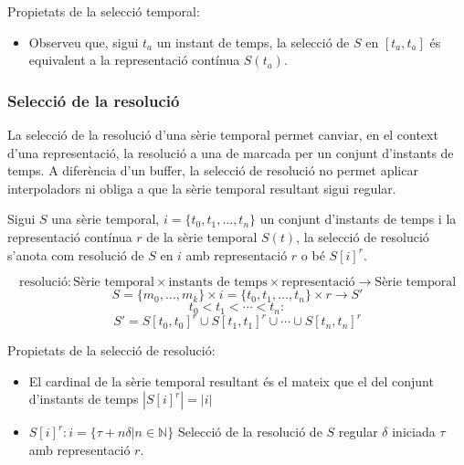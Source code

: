 Propietats de la selecció temporal:

\begin{itemize}
\item Observeu que, sigui $t_a$ un instant de temps, la selecció de $S$ en $[t_a,t_a]$ és equivalent a la representació contínua $S(t_a)$. 
\end{itemize}







\subsubsection{Selecció de la resolució}

La selecció de la resolució d'una sèrie temporal permet canviar, en el
context d'una representació, la resolució a una de marcada per un
conjunt d'instants de temps. A diferència d'un buffer, la selecció de
resolució no permet aplicar interpoladors ni obliga a que la sèrie
temporal resultant sigui regular.

Sigui $S$ una sèrie temporal, $i= \{t_0,t_1,\dotsc,t_n\}$ un conjunt
d'instants de temps i la representació contínua $r$ de la sèrie
temporal $S(t)$, la selecció de resolució s'anota com resolució de $S$
en $i$ amb representació $r$ o bé $S[i]^r$.

\begin{definition}
  \[
  \text{resolució}: \text{Sèrie temporal} \times \text{instants de
    temps} \times \text{representació} \longrightarrow \text{Sèrie
    temporal}
  \]
  \[
  S = \{m_0 , \ldots , m_k\} \times i = \{t_0,t_1,\dotsc,t_n\} \times r
  \longrightarrow S'
  \]
  \[
  t_0 < t_1 < \dotsb < t_n:
  \]
  \[
  S' = S[t_0,t_0]^r \cup  S[t_1,t_1]^r \cup \dotsb \cup S[t_{n},t_n]^r
  \] 
\end{definition}



Propietats de la selecció de resolució:
\begin{itemize}

\item El cardinal de la sèrie temporal resultant és el mateix que el del conjunt d'instants de temps $|S[i]^r| = |i|$

\item  $S[i]^r: i = \{\tau+n\delta | n\in\mathbb{N}\}$ Selecció de la resolució de $S$ regular $\delta$ iniciada $\tau$  amb representació $r$.
\end{itemize}







